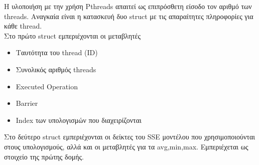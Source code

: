 \documentclass[11pt]{article}
\begin{document}
\hspace*{8mm}Η υλοποιήση με την χρήση Pthreads  απαιτεί ως επιπρόσθετη είσοδο τον αριθμό των threads.  Αναγκαία είναι η κατασκευή δυο struct με τις απαραίτητες πληροφορίες για κάθε thread. \\Στο πρώτο struct  εμπεριέχονται οι μεταβλητές
\begin{itemize}
\item Ταυτότητα του  thread (ID) 
\item Συνολικός αριθμός threads
\item Executed Operation
\item Barrier
\item {}Index  των υπολογισμών που διαχειρίζονται
\end{itemize} 
\hspace*{8mm}Στο δεύτερο struct  εμπεριέχονται οι δείκτες του SSE μοντέλου που χρησιμοποιούνται στους υπολογισμούς, αλλά και οι μεταβλητές για τα  avg,min,max. Εμπεριέχεται ως στοιχείο της πρώτης δομής.
\end{document}
